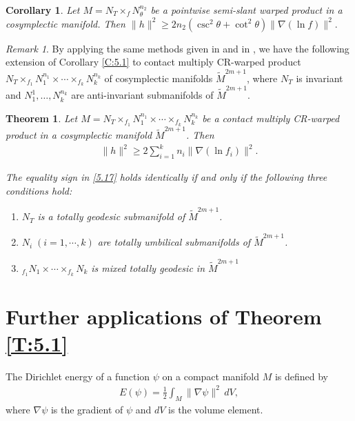 \documentclass[reqno]{amsart}
\theoremstyle{plain}
\newtheorem{theorem}{Theorem}[section]
\newtheorem{corollary}{Corollary}[section]
\theoremstyle{remark}
\newtheorem{remark}{Remark}[section]
\numberwithin{equation}{section}
\begin{document}
\begin{corollary}\label{C:5.2}  Let $M=N_T\times_{f}N^{n_{2}}_\theta$ be a  pointwise semi-slant warped product in a cosymplectic manifold. Then 
$\|h\|^2\geq2n_2(\csc^2\theta+\cot^2\theta)\|\nabla(\ln f)\|^2.$
\end{corollary}

\begin{remark} By applying the same methods given in \cite{CD} and in \cite{HM}, we have the following extension of Corollary \ref{C:5.1} to  contact multiply CR-warped product  $N_T\times_{f_1}N_1^{n_{1}}\times\cdots\times_{f_k}N_k^{n_{k}}$ of cosymplectic manifolds $\widetilde M^{2m+1}$, where $N_T$ is invariant and $N_{1}^{1},\ldots,N_{k}^{n_{k}}$ are anti-invariant submanifolds of $\widetilde M^{2m+1}$.

\begin{theorem}\label{T:5.2} Let $M=N_T\times_{f_1}N_1^{n_{1}}\times\cdots\times_{f_k}N_k^{n_{k}}$ be a contact multiply CR-warped product in a cosymplectic manifold $\widetilde M^{2m+1}$. Then
\begin{align}\label{5.17}
\|h\|^2\geq2\sum_{i=1}^{k}n_i \|\nabla(\ln f_i)\|^2.
\end{align}

The equality sign in \eqref{5.17} holds identically if and only if the following three conditions hold:
\begin{enumerate}
\item[(a)] $N_T$ is a totally geodesic submanifold of $\widetilde M^{2m+1}$.
\item[(b)] $N_i\; (i=1,\cdots, k)$ are totally umbilical submanifolds of $\widetilde M^{2m+1}$.
\item[(c)] $_{f_1}N_1\times\cdots\times_{f_k}N_k$ is mixed totally geodesic in $\widetilde M^{2m+1}$
\end{enumerate}
\end{theorem}
\end{remark}




\section{Further applications of Theorem \ref{T:5.1}}\label{S6}

The Dirichlet energy of a function $\psi$ on a compact manifold $M$ is defined by
\begin{align}\label{eng}E(\psi)=\frac{1}{2}\int_{M}\|\nabla\psi\|^2\,dV, \end{align}
where $\nabla\psi$ is the gradient of $\psi$ and $dV$ is the volume element.
\end{document}
